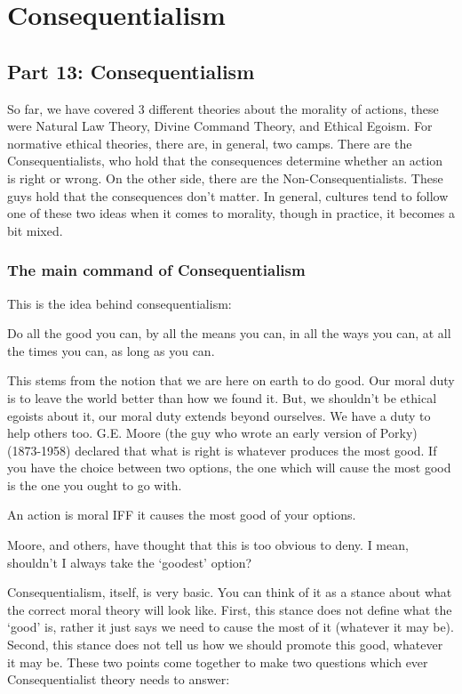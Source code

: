 \part{Consequentialism}
\label{ch.mod5}
\chapter{Part 13: Consequentialism}
So far, we have covered 3 different theories about the morality of actions, these were Natural Law Theory, Divine Command Theory, and Ethical Egoism. For normative ethical theories, there are, in general, two camps. There are the Consequentialists, who hold that the consequences determine whether an action is right or wrong. On the other side, there are the Non-Consequentialists. These guys hold that the consequences don’t matter. In general, cultures tend to follow one of these two ideas when it comes to morality, though in practice, it becomes a bit mixed.

\section{The main command of Consequentialism}

This is the idea behind consequentialism:
\begin{center}
Do all the good you can, by all the means you can, in all the ways you can, at all the times you can, as long as you can.
\end{center}
This stems from the notion that we are here on earth to do good. Our moral duty is to leave the world better than how we found it. But, we shouldn’t be ethical egoists about it, our moral duty extends beyond ourselves. We have a duty to help others too. G.E. Moore (the guy who wrote an early version of Porky) (1873-1958) declared that what is right is whatever produces the most good. If you have the choice between two options, the one which will cause the most good is the one you ought to go with.
\begin{center}
An action is moral IFF it causes the most good of your options.
\end{center}
Moore, and others, have thought that this is too obvious to deny. I mean, shouldn’t I always take the ‘goodest’ option? 

Consequentialism, itself, is very basic. You can think of it as a stance about what the correct moral theory will look like. First, this stance does not define what the `good' is, rather it just says we need to cause the most of it (whatever it may be). Second, this stance does not tell us how we should promote this good, whatever it may be. These two points come together to make two questions which ever Consequentialist theory needs to answer:


